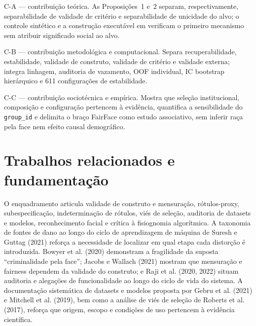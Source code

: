 \begin{contribution}C-A --- contribuição teórica. As Proposições~1 e~2 separam, respectivamente, separabilidade de validade de critério e separabilidade de unicidade do alvo; o controle sintético e a construção executável em  verificam o primeiro mecanismo sem atribuir significado social ao alvo.\end{contribution}

\begin{contribution}C-B --- contribuição metodológica e computacional. Separa recuperabilidade, estabilidade, validade de construto, validade de critério e validade externa; integra linhagem, auditoria de vazamento, OOF individual, IC bootstrap hierárquico e 611 configurações de estabilidade.\end{contribution}

\begin{contribution}C-C --- contribuição sociotécnica e empírica. Mostra que seleção institucional, composição e configuração pertencem à evidência, quantifica a sensibilidade do \texttt{group\_id} e delimita o braço FairFace como estudo associativo, sem inferir raça pela face nem efeito causal demográfico.\end{contribution}

\section{Trabalhos relacionados e fundamentação}

O enquadramento articula validade de construto e mensuração, rótulos-proxy, subespecificação, indeterminação de rótulos, viés de seleção, auditoria de datasets e modelos, reconhecimento facial e crítica à fisiognomia algorítmica. A taxonomia de fontes de dano ao longo do ciclo de aprendizagem de máquina de Suresh e Guttag (2021) reforça a necessidade de localizar em qual etapa cada distorção é introduzida. Bowyer et al. (2020) demonstram a fragilidade da suposta ``criminalidade pela face''; Jacobs e Wallach (2021) mostram que mensuração e fairness dependem da validade do construto; e Raji et al. (2020, 2022) situam auditoria e alegações de funcionalidade ao longo do ciclo de vida do sistema. A documentação sistemática de datasets e modelos proposta por Gebru et al. (2021) e Mitchell et al. (2019), bem como a análise de viés de seleção de Roberts et al. (2017), reforça que origem, escopo e condições de uso pertencem à evidência científica.

